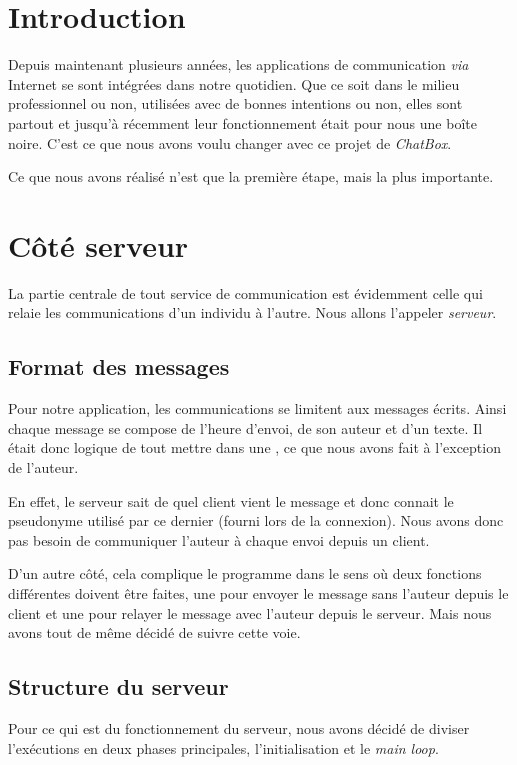 \section{Introduction}

Depuis maintenant plusieurs années, les applications de
communication \emph{via} Internet se sont intégrées dans notre
quotidien. Que ce soit dans le milieu professionnel ou non,
utilisées avec de bonnes intentions ou non, elles sont
partout et jusqu'à récemment leur fonctionnement était pour
nous une boîte noire. C'est ce que nous avons voulu changer
avec ce projet de \emph{ChatBox}.

Ce que nous avons réalisé n'est que la première
étape, mais la plus importante.

\section{Côté serveur}

La partie centrale de tout service de communication est
évidemment celle qui relaie les communications d'un individu
à l'autre. Nous allons l'appeler \emph{serveur}.

\subsection{Format des messages}

Pour notre application, les communications se limitent aux
messages écrits. Ainsi chaque message se compose de l'heure
d'envoi, de son auteur et d'un texte.
Il était donc logique de tout mettre dans une
\verb@struct@, ce que nous avons fait à l'exception
de l'auteur.

En effet, le serveur sait de quel client vient le message et
donc connait le pseudonyme utilisé par ce dernier (fourni
lors de la connexion). Nous avons donc pas besoin de
communiquer l'auteur à chaque envoi depuis un client.

D'un autre côté, cela complique le programme dans le sens où
deux fonctions différentes doivent être faites, une pour
envoyer le message sans l'auteur depuis le client et une
pour relayer le message avec l'auteur depuis le serveur.
Mais nous avons tout de même décidé de suivre cette voie.

\subsection{Structure du serveur}

Pour ce qui est du fonctionnement du serveur,
nous avons décidé de diviser l'exécutions en deux phases
principales, l'initialisation et le \emph{main loop}.

